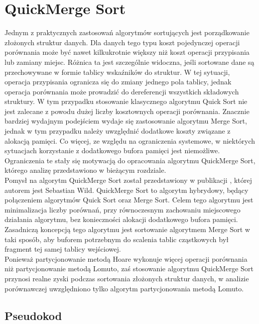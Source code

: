 \section{QuickMerge Sort}
Jednym z praktycznych zastosowań algorytmów sortujących jest porządkowanie złożonych struktur danych. Dla danych tego typu koszt pojedynczej operacji porównania może być nawet kilkukrotnie większy niż koszt operacji przypisania lub zamiany miejsc. Różnica ta jest szczególnie widoczna, jeśli sortowane dane są przechowywane w formie tablicy wskaźników do struktur. W tej sytuacji, operacja przypisania ogranicza się do zmiany jednego pola tablicy, jednak operacja porównania może prowadzić do dereferencji wszystkich składowych struktury. W tym przypadku stosowanie klasycznego algorytmu Quick Sort nie jest zalecane z powodu dużej liczby kosztownych operacji porównania. Znacznie bardziej wydajnym podejściem wydaje się zastosowanie algorytmu Merge Sort, jednak w tym przypadku należy uwzględnić dodatkowe koszty związane z alokacją pamięci. Co więcej, ze względu na ograniczenia systemowe, w niektórych sytuacjach korzystanie z dodatkowego bufora pamięci jest niemożliwe. Ograniczenia te stały się motywacją do opracowania algorytmu QuickMerge Sort, którego analizę przedstawiono w bieżącym rozdziale.\\

Pomysł na algorytm QuickMerge Sort został przedstawiony w publikacji , której autorem jest Sebastian Wild. QuickMerge Sort to algorytm hybrydowy, będący połączeniem algorytmów Quick Sort oraz Merge Sort. Celem tego algorytmu jest minimalizacja liczby porównań, przy równoczesnym zachowaniu miejscowego działania algorytmu, bez konieczności alokacji dodatkowego bufora pamięci. Zasadniczą koncepcją tego algorytmu jest sortowanie algorytmem Merge Sort w taki sposób, aby buforem potrzebnym do scalenia tablic cząstkowych był fragment tej samej tablicy wejściowej.\\


Ponieważ partycjonowanie metodą Hoare wykonuje więcej operacji porównania niż partycjonowanie metodą Lomuto, zaś stosowanie algorytmu QuickMerge Sort przynosi realne zyski podczas sortowania złożonych struktur danych, w analizie porównawczej uwzględniono tylko algorytm partycjonowania metodą Lomuto.\\

\subsection{Pseudokod}

